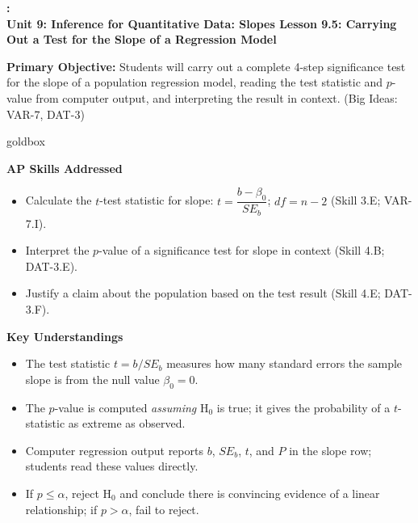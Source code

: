 \documentclass[10pt]{article}
\newcommand{\UnitNumberName}{Unit 9: Inference for Quantitative Data: Slopes \quad}
\newcommand{\LessonNumberName}{Lesson 9.5: Carrying Out a Test for the Slope of a Regression Model}
\begin{document}
\begin{center}
    {\Large\bfseries \CourseName: \SchoolYear \\
    {\small\bfseries \UnitNumberName \LessonNumberName}}
\end{center}

\begin{tcolorbox}[colback=sky, colframe=navy, boxrule=0.9pt, arc=2mm,
    left=2mm, right=2mm, top=1.5mm, bottom=1.5mm]
    \textbf{Primary Objective:} Students will carry out a complete 4-step significance
    test for the slope of a population regression model, reading the test statistic and
    $p$-value from computer output, and interpreting the result in context.
    (Big Ideas: VAR-7, DAT-3)
\end{tcolorbox}

\renewcommand{\arraystretch}{1.6}
\begin{skillbox}{goldbox}
\begin{minipage}[t]{0.48\linewidth}
    \textbf{AP Skills Addressed}
    \begin{itemize}
        \item Calculate the $t$-test statistic for slope:
              $t = \dfrac{b - \beta_0}{SE_b}$; $df = n - 2$ (Skill 3.E; VAR-7.I).
        \item Interpret the $p$-value of a significance test for slope in context
              (Skill 4.B; DAT-3.E).
        \item Justify a claim about the population based on the test result
              (Skill 4.E; DAT-3.F).
    \end{itemize}
\end{minipage}
\hfill
\begin{minipage}[t]{0.48\linewidth}
    \textbf{Key Understandings}
    \begin{itemize}
        \item The test statistic $t = b / SE_b$ measures how many standard errors the
              sample slope is from the null value $\beta_0 = 0$.
        \item The $p$-value is computed \emph{assuming} H$_0$ is true; it gives the
              probability of a $t$-statistic as extreme as observed.
        \item Computer regression output reports $b$, $SE_b$, $t$, and $P$ in the
              slope row; students read these values directly.
        \item If $p \le \alpha$, reject H$_0$ and conclude there is convincing evidence
              of a linear relationship; if $p > \alpha$, fail to reject.
    \end{itemize}
\end{minipage}
\end{skillbox}
\end{document}
